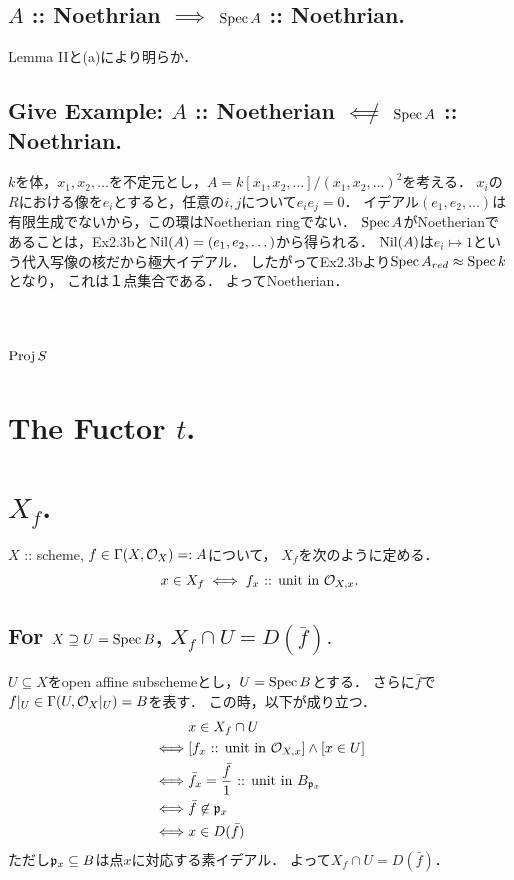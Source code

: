 \documentclass[a4paper]{jsarticle}
\begin{document}
    \subsection{$A$ :: Noethrian $\implies$ $\operatorname{Spec} A$ :: Noethrian.}
    Lemma IIと(a)により明らか．

    \subsection{Give Example: $A$ :: Noetherian $\not \impliedby$ $\operatorname{Spec} A$ :: Noethrian.}
    $k$を体，$x_1,x_2,\dots$を不定元とし，$A=k[x_1,x_2,\dots]/(x_1,x_2,\dots)^2$を考える．
    $x_i$の$R$における像を$e_i$とすると，任意の$i,j$について$e_i e_j=0$．
    イデアル$(e_1,e_2,\dots)$は有限生成でないから，この環はNoetherian ringでない．
    $\operatorname{Spec} A$がNoetherianであることは，Ex2.3bと$\operatorname{Nil}(A)=(e_1,e_2,\dots)$から得られる．
    $\operatorname{Nil}(A)$は$e_i \mapsto 1$という代入写像の核だから極大イデアル．
    したがってEx2.3bより$\operatorname{Spec} A_{red} \approx \operatorname{Spec} k$となり，
    これは１点集合である．
    よってNoetherian．

\section{$\operatorname{Proj} S$} %

\section{The Fuctor $t$.} %

\section{$X_f$.} %
    $X$ :: scheme, $f \in \Gamma(X, \mathcal{O}_X)=:A$について，
    $X_f$を次のように定める．
    \[ x \in X_f \iff f_x \text{ :: unit in }\mathcal{O}_{X,x}. \]

    \subsection{For $X \supseteq U=\operatorname{Spec} B$, $X_f \cap U=D(\bar{f}).$}
    $U \subseteq X$をopen affine subschemeとし，$U=\operatorname{Spec} B$とする．
    さらに$\bar{f}$で$f|_{U} \in \Gamma(U,\mathcal{O}_X|_U)=B$を表す．
    この時，以下が成り立つ．
    \begin{align*}
        {}&     x \in X_f \cap U \\
        \iff&   [ f_x \text{ :: unit in }\mathcal{O}_{X,x}] \land [x \in U] \\
        \iff&   \bar{f}_x=\frac{\bar{f}}{1} \text{ :: unit in }B_{\mathfrak{p}_x} \\
        \iff&   \bar{f} \not\in \mathfrak{p}_x \\
        \iff&   x \in D(\bar{f})
    \end{align*}
    ただし$\mathfrak{p}_x \subseteq B$は点$x$に対応する素イデアル．
    よって$X_f \cap U=D(\bar{f})$．
\end{document}
